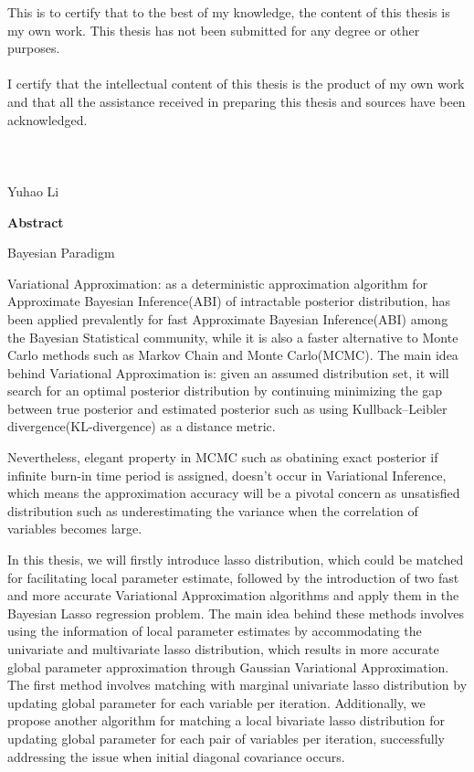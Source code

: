 \noindent This is to certify that to the best of my knowledge, the content of this thesis is my own work. This thesis has not been submitted for any degree or other purposes.\\
\\
\noindent I certify that the intellectual content of this thesis is the product of my own work and that all the assistance received in preparing this thesis and sources have been acknowledged.\\
\\
\\
\\
Yuhao Li

\pagebreak
\hspace{0pt}

\begin{center}
    \textbf{\large Abstract }\\
    \vspace{0.5cm}
\end{center}
Bayesian Paradigm

Variational Approximation: as a deterministic approximation algorithm for Approximate Bayesian Inference(ABI) of intractable posterior distribution, has been applied prevalently for fast Approximate Bayesian Inference(ABI) among the Bayesian Statistical community, while it is also a faster alternative to Monte Carlo methods such as Markov Chain and Monte Carlo(MCMC).
The main idea behind Variational Approximation is: given an assumed distribution set, it will search for an optimal posterior distribution by continuing minimizing the gap between true posterior and estimated posterior such as using Kullback–Leibler divergence(KL-divergence) as a distance metric.

Nevertheless, elegant property in MCMC such as obatining exact posterior if infinite burn-in time period is assigned, doesn't occur in Variational Inference, which means the approximation accuracy will be a pivotal concern as  unsatisfied distribution such as underestimating the variance when the correlation of variables becomes large. 

In this thesis, we will firstly introduce lasso distribution, which could be matched for facilitating local parameter estimate, followed by the introduction of two fast and more accurate Variational Approximation algorithms and apply them in the Bayesian Lasso regression problem. The main idea behind these methods involves using the information of local parameter estimates by accommodating the univariate and multivariate lasso distribution, which results in more accurate global parameter approximation through Gaussian Variational Approximation. 
The first method involves matching with marginal univariate lasso distribution by updating global parameter for each variable per iteration. Additionally, we propose another algorithm for matching a local bivariate lasso distribution for updating global parameter for each pair of variables per iteration, successfully addressing the issue when initial diagonal covariance occurs.

